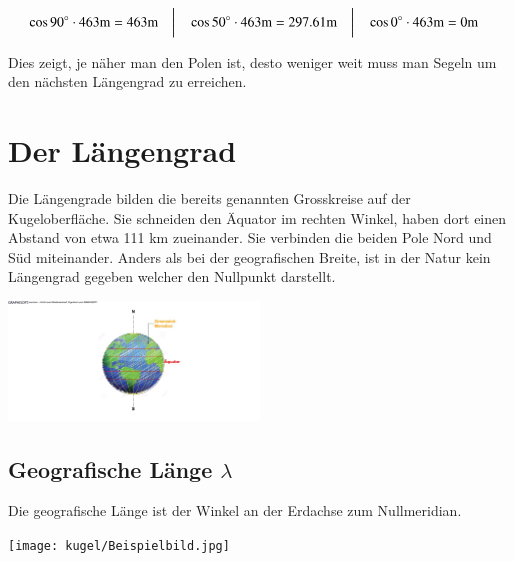 \begin{refsection}
\begin{refsection}
\[
\begin{aligned}
&\cos 90^\circ \cdot 463\text{m} = 463\text{m}
&
&\text{\bigg \vert}
&
&\cos 50^\circ \cdot 463\text{m} = 297.61\text{m}
&
&\text{\bigg \vert}
&
&\cos 0^\circ \cdot 463\text{m} = 0\text{m}
\end{aligned}
\]

Dies zeigt, je näher man den Polen ist, desto weniger weit muss man Segeln um den nächsten Längengrad zu erreichen.



\section{Der Längengrad}
Die Längengrade bilden die bereits genannten Grosskreise auf der Kugeloberfläche.
Sie schneiden den Äquator im rechten Winkel, haben dort einen Abstand von etwa 111 km zueinander. Sie verbinden die beiden Pole Nord und Süd miteinander. Anders als bei der geografischen Breite, ist in der Natur kein Längengrad gegeben welcher den Nullpunkt darstellt.

\begin{center}
        \includegraphics[width=0.5\textwidth]{kugel/1Langengrad.jpg}
\end{center}


\subsection{Geografische Länge $\lambda$}
\begin{definition}
Die geografische Länge ist der Winkel an der Erdachse zum Nullmeridian.
\end{definition}

\begin{center}
        \texttt{[image: kugel/Beispielbild.jpg]}
\end{center}


\end{refsection}
\end{refsection}
